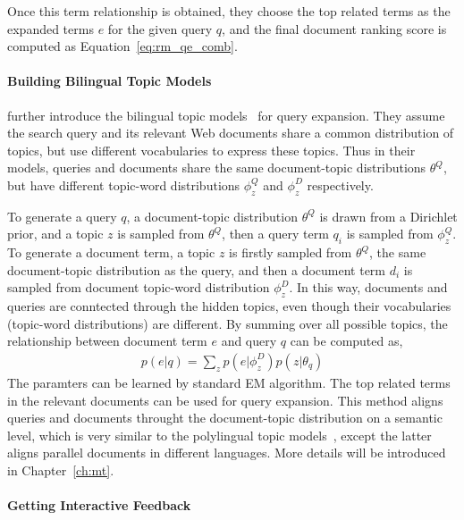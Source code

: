 Once this term relationship is obtained, they choose the top related
terms as the expanded terms $e$ for the given query $q$, and the final
document ranking score is computed as Equation~\ref{eq:rm_qe_comb}.

\paragraph{Building Bilingual Topic Models}

\cite{Gao-2012} further introduce the bilingual topic
models~\citep{Gao-2011} for query expansion. They assume the search
query and its relevant Web documents share a common distribution of
topics, but use different vocabularies to express these topics. Thus
in their models, queries and documents share the same document-topic
distributions $\theta^Q$, but have different topic-word distributions
$\phi_z^Q$ and $\phi_z^D$ respectively.

To generate a query $q$, a document-topic distribution $\theta^Q$ is
drawn from a Dirichlet prior, and a topic $z$ is sampled from
$\theta^Q$, then a query term $q_i$ is sampled from $\phi_z^Q$. To
generate a document term, a topic $z$ is firstly sampled from
$\theta^Q$, the same document-topic distribution as the query, and
then a document term $d_i$ is sampled from document topic-word
distribution $\phi_z^D$. In this way, documents and queries are
conntected through the hidden topics, even though their vocabularies
(topic-word distributions) are different. By summing over all possible
topics, the relationship between document term $e$ and query $q$ can
be computed as,
\begin{align}
p(e|q) = \sum_z p(e|\phi_z^D) p(z | \theta_q)
\end{align}
The paramters can be learned by standard EM algorithm. The top related
terms in the relevant documents can be used for query expansion. This
method aligns queries and documents throught the document-topic
distribution on a semantic level, which is very similar to the
polylingual topic models~\citep{mimno-09}, except the latter aligns
parallel documents in different languages. More details will be
introduced in Chapter~\ref{ch:mt}.


\paragraph{Getting Interactive Feedback}

